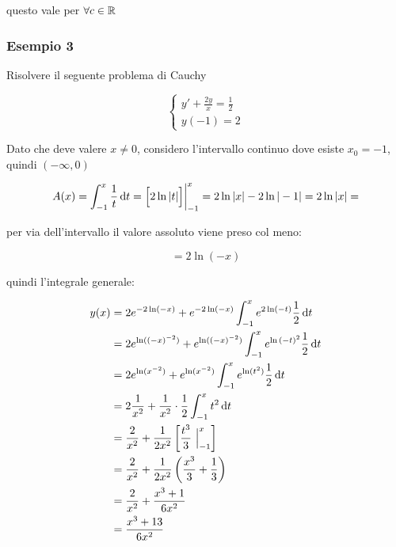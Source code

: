 questo vale per \(\forall c \in \mathbb{R} \)

\pagebreak
\subsubsection*{Esempio 3}

Risolvere il seguente problema di Cauchy

\begin{equation*}
    \begin{cases}
        y' + \frac{2y}{x} = \frac{1}{2} \\
        y(-1)=2
    \end{cases}
\end{equation*}

Dato che deve valere \(x \ne 0\), considero l'intervallo continuo dove esiste \(x_0=-1\), quindi \((-\infty,0)\)

\[
    A(x) = \int_{{-1}}^{{x}} \frac{1}{t} \mathop{}\!\mathrm{d} t = {\Bigl[2 \ln{|t|}\Bigr]} \bigg|_{-1}^{x} = 2 \ln{|x|} - 2 \ln{|-1|} = 2 \ln{|x|} =
\]

per via dell'intervallo il valore assoluto viene preso col meno:

\[
    =2 \ln(-x)
\]

quindi l'integrale generale:
\begin{spreadlines}{2mm}
    \begin{align*}
        y(x) & = 2e^{-2\ln(-x)}+ e^{-2\ln(-x)} \int_{{-1}}^{{x}} e^{2\ln(-t)} \frac{1}{2} \mathop{}\!\mathrm{d} t                   \\
            & = 2e^{\ln({(-x)}^{-2})} + e^{\ln({(-x)}^{-2})} \int_{{-1}}^{{x}} e^{\ln {(-t)}^2} \frac{1}{2} \mathop{}\!\mathrm{d} t \\
            & = 2e^{\ln(x^{-2})} + e^{\ln(x^{-2})} \int_{{-1}}^{{x}} e^{\ln(t^2)} \frac{1}{2} \mathop{}\!\mathrm{d} t               \\
            & = 2\frac{1}{x^{2}} + \frac{1}{x^{2}} \cdot \frac{1}{2}\int_{{-1}}^{{x}} t^{2} \mathop{}\!\mathrm{d} t                 \\
            & = \frac{2}{x^{2}} + \frac{1}{2x^{2}} \left[ \frac{t^3}{3} ~\Big|_{-1}^{x} \right]                     \\
            & = \frac{2}{x^{2}} + \frac{1}{2x^{2}} \left(\frac{x^3}{3}+\frac{1}{3}\right)                           \\
            & = \frac{2}{x^{2}} + \frac{x^3 + 1}{6x^2}                                                              \\
            & = \frac{x^3 + 13}{6x^2}
    \end{align*}
\end{spreadlines}

